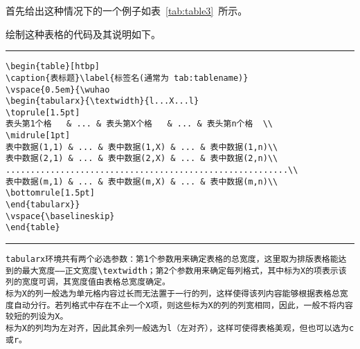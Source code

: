 首先给出这种情况下的一个例子如表~\ref{tab:table3}~所示。
\begin{table}[htbp]
\caption{最小的三个正整数的英文表示法}\label{tab:table3}
\vspace{\baselineskip}
\end{table}
绘制这种表格的代码及其说明如下。
\vspace{1em}\noindent\hrule
\begin{verbatim}
\begin{table}[htbp]
\caption{表标题}\label{标签名(通常为 tab:tablename)}
\vspace{0.5em}{\wuhao
\begin{tabularx}{\textwidth}{l...X...l}
\toprule[1.5pt]
表头第1个格   & ... & 表头第X个格   & ... & 表头第n个格  \\
\midrule[1pt]
表中数据(1,1) & ... & 表中数据(1,X) & ... & 表中数据(1,n)\\
表中数据(2,1) & ... & 表中数据(2,X) & ... & 表中数据(2,n)\\
.........................................................\\
表中数据(m,1) & ... & 表中数据(m,X) & ... & 表中数据(m,n)\\
\bottomrule[1.5pt]
\end{tabularx}}
\vspace{\baselineskip}
\end{table}
\end{verbatim}

\noindent\hrule
\begin{verbatim}
tabularx环境共有两个必选参数：第1个参数用来确定表格的总宽度，这里取为排版表格能达到的最大宽度——正文宽度\textwidth；第2个参数用来确定每列格式，其中标为X的项表示该列的宽度可调，其宽度值由表格总宽度确定。
标为X的列一般选为单元格内容过长而无法置于一行的列，这样使得该列内容能够根据表格总宽度自动分行。若列格式中存在不止一个X项，则这些标为X的列的列宽相同，因此，一般不将内容较短的列设为X。
标为X的列均为左对齐，因此其余列一般选为l（左对齐），这样可使得表格美观，但也可以选为c或r。
\end{verbatim}

